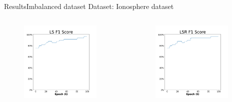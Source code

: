 \documentclass[
	aspectratio=169,	%
	onlytextwidth,		%
	t,					%
	]{beamer}
\begin{document}
	\begin{frame}[fragile]{Results}{Imbalanced dataset} 
		\scriptsize
		Dataset: Ionosphere dataset~\cite{ion} 
		\newline
		\begin{columns}
			
			\begin{column}[T]{0.33\textwidth}
				\begin{figure}
					\includegraphics[width=0.9\textwidth]{myfigs/LS_i_res.png}
				\end{figure}
			\end{column}
		
			\begin{column}[T]{0.33\textwidth}
				\begin{figure}
					\includegraphics[width=0.9\textwidth]{myfigs/LSR_i_res.png}
				\end{figure}
			\end{column}
		

\end{columns}
\end{frame}
\end{document}
